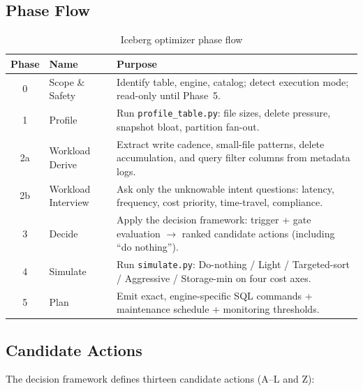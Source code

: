 \documentclass[11pt,a4paper]{article}
\newcommand{\code}[1]{\texttt{#1}}
\begin{document}
\subsection{Phase Flow}

\begin{table}[ht]
\centering
\caption{Iceberg optimizer phase flow}
\begin{tabular}{clp{9cm}}
\toprule
\textbf{Phase} & \textbf{Name} & \textbf{Purpose} \\
\midrule
0  & Scope \& Safety      & Identify table, engine, catalog; detect execution mode; read-only until Phase~5. \\
1  & Profile              & Run \code{profile\_table.py}: file sizes, delete pressure, snapshot bloat, partition fan-out. \\
2a & Workload Derive      & Extract write cadence, small-file patterns, delete accumulation, and query filter columns from metadata logs. \\
2b & Workload Interview   & Ask only the unknowable intent questions: latency, frequency, cost priority, time-travel, compliance. \\
3  & Decide               & Apply the decision framework: trigger + gate evaluation $\to$ ranked candidate actions (including ``do nothing''). \\
4  & Simulate             & Run \code{simulate.py}: Do-nothing / Light / Targeted-sort / Aggressive / Storage-min on four cost axes. \\
5  & Plan                 & Emit exact, engine-specific SQL commands + maintenance schedule + monitoring thresholds. \\
\bottomrule
\end{tabular}
\end{table}

\subsection{Candidate Actions}

The decision framework defines thirteen candidate actions (A--L and Z):
\end{document}
